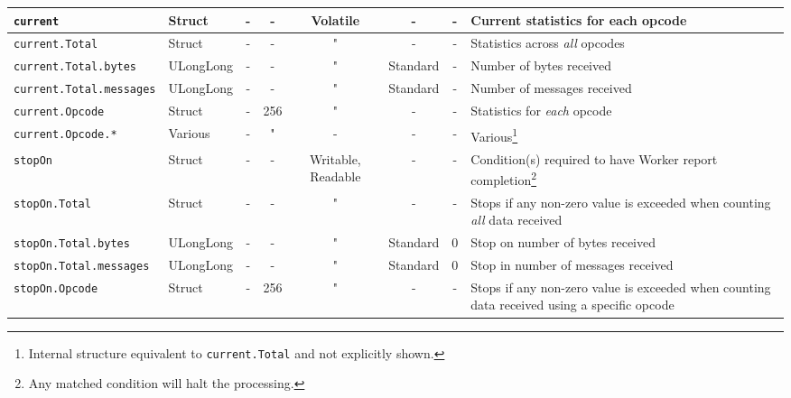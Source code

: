\documentclass{article}
\begin{document}
\begin{landscape}
\begin{minipage}{\textwidth}
\begin{scriptsize}
\begin{tabular}{|p{3.2cm}|p{1.5cm}|c|c|c|c|c|p{7cm}|}
      \hline
      \verb+current+                & Struct    & -              & -               & Volatile           & -           & -             & Current statistics for each opcode \\
      \hline
      \verb+current.Total+          & Struct    & -              & -               & "                  & -           & -             & Statistics across \textit{all} opcodes \\
      \hline
      \verb+current.Total.bytes+    & ULongLong & -              & -               & "                  & Standard    & -             & Number of bytes received \\
      \hline
      \verb+current.Total.messages+ & ULongLong & -              & -               & "                  & Standard    & -             & Number of messages received \\
      \hline
      \verb+current.Opcode+         & Struct    & -              & 256             & "                  & -           & -             & Statistics for \textit{each} opcode \\
      \hline
      \verb+current.Opcode.*+       & Various   & -              & "               & -                  & -           & -             & Various\footnote{Internal structure equivalent to \texttt{current.Total} and not explicitly shown.} \\
      \hline
      \verb+stopOn+                 & Struct    & -              & -               & Writable, Readable & -           & -             & Condition(s) required to have Worker report completion\footnote{Any matched condition will halt the processing.} \\
      \hline
      \verb+stopOn.Total+           & Struct    & -              & -               & "                  & -           & -             & Stops if any non-zero value is exceeded when counting \textit{all} data received \\
      \hline
      \verb+stopOn.Total.bytes+     & ULongLong & -              & -               & "                  & Standard    & 0             & Stop on number of bytes received \\
      \hline
      \verb+stopOn.Total.messages+  & ULongLong & -              & -               & "                  & Standard    & 0             & Stop in number of messages received \\
      \hline
      \verb+stopOn.Opcode+          & Struct    & -              & 256             & "                  & -           & -             & Stops if any non-zero value is exceeded when counting data received using a specific opcode \\

\end{tabular}
\end{scriptsize}
\end{minipage}
\end{landscape}
\end{document}
